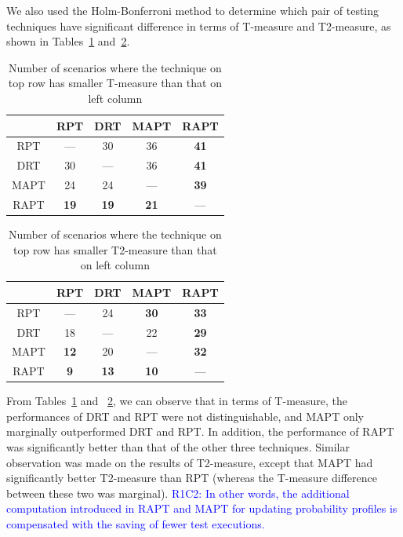 \documentclass[10pt,journal,compsoc]{IEEEtran}
\begin{document}
We also used the Holm-Bonferroni method to determine which pair of testing techniques have significant difference in terms of T-measure and T2-measure, as shown in Tables~\ref{tab:Tsta} and~\ref{tab:T2sta}.

\begin{table}
\caption{Number of scenarios where the technique on top row has smaller T-measure than that on left column}
\label{tab:Tsta}
\centering
\begin{tabular}{|c|c|c|c|c|} \hline
			& RPT					& DRT					& MAPT				& RAPT				\\ \hline
RPT		& ---					& 30					& 36					& \textbf{41}	\\ \hline
DRT		& 30					& ---					& 36					& \textbf{41}	\\ \hline
MAPT	& 24					& 24					& ---					& \textbf{39}	\\ \hline
RAPT	& \textbf{19}	& \textbf{19}	& \textbf{21}	& ---					\\ \hline
\end{tabular}
\end{table}

\begin{table}
\caption{Number of scenarios where the technique on top row has smaller T2-measure than that on left column}
\label{tab:T2sta}
\centering
\begin{tabular}{|c|c|c|c|c|} \hline
			& RPT					& DRT					& MAPT				& RAPT				\\ \hline
RPT		& ---					& 24					& \textbf{30}	& \textbf{33}	\\ \hline
DRT		& 18					& ---					& 22					& \textbf{29}	\\ \hline
MAPT	& \textbf{12}	& 20					& ---					& \textbf{32}	\\ \hline
RAPT	& \textbf{9}	& \textbf{13}	& \textbf{10}	& ---					\\ \hline
\end{tabular}
\end{table}

From Tables~\ref{tab:Tsta} and ~\ref{tab:T2sta}, we can observe that in terms of T-measure, the performances of DRT and RPT were not distinguishable, and MAPT only marginally outperformed DRT and RPT. In addition, the performance of RAPT was significantly better than that of the other three techniques. Similar observation was made on the results of T2-measure, except that MAPT had significantly better T2-measure than RPT (whereas the T-measure difference between these two was marginal). \textcolor{blue}{R1C2: In other words, the additional computation introduced in RAPT and MAPT for updating probability profiles is compensated with the saving of fewer test executions.}
\end{document}
